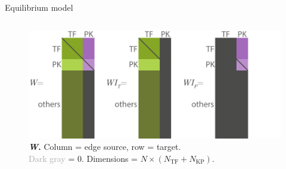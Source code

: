 \begin{frame}{Equilibrium model}
\begin{columns}
\begin{column}{0.5\textwidth}
\begin{figure}[ht]
    \centering
    \includegraphics[width=\textwidth]{methods/fig/W.pdf}
    \caption{\textbf{\textit{W}.} Column = edge source, row = target. \\ \textcolor{darkgray}{Dark gray} = 0. Dimensions = $N \times (N_\text{TF} + N_\text{KP})$. }
    \label{fig:W}
\end{figure}
\end{column}
\end{columns}
\end{frame}

